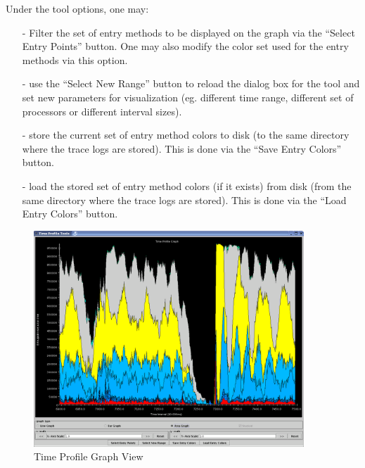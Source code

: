 \documentclass[10pt]{article}
\begin{document}
Under the tool options, one may:

\begin{itemize}
\item[-] Filter the set of entry methods to be displayed on the graph via
the ``Select Entry Points'' button. One may also modify the color set used
for the entry methods via this option.
\item[-] use the ``Select New Range'' button to reload the dialog box
for the tool and set new parameters for visualization (eg. different
time range, different set of processors or different interval sizes).
\item[-] store the current set of entry method colors to disk (to the
same directory where the trace logs are stored). This is done via the
``Save Entry Colors'' button.
\item[-] load the stored set of entry method colors (if it exists)
from disk (from the same directory where the trace logs are
stored). This is done via the ``Load Entry Colors'' button.
\end{itemize}

\begin{figure}[htb]
\center
\includegraphics[width=4.0in]{fig/timeprofile}
\caption{Time Profile Graph View}
\label{time profile}
\end{figure}
\end{document}
